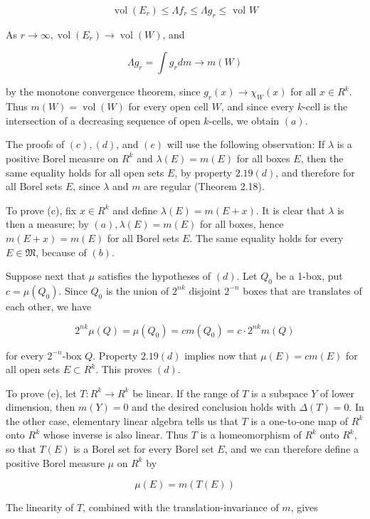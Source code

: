 \documentclass[10pt]{article}
\begin{document}
$$
\operatorname{vol}\left(E_{r}\right) \leq \Lambda f_{r} \leq \Lambda g_{r} \leq \text { vol } W
$$

As $r \rightarrow \infty, \operatorname{vol}\left(E_{r}\right) \rightarrow \operatorname{vol}(W)$, and

$$
\Lambda g_{r}=\int g_{r} d m \rightarrow m(W)
$$

by the monotone convergence theorem, since $g_{r}(x) \rightarrow \chi_{W}(x)$ for all $x \in R^{k}$. Thus $m(W)=\operatorname{vol}(W)$ for every open cell $W$, and since every $k$-cell is the intersection of a decreasing sequence of open $k$-cells, we obtain $(a)$.

The proofs of $(c),(d)$, and $(e)$ will use the following observation: If $\lambda$ is a positive Borel measure on $R^{k}$ and $\lambda(E)=m(E)$ for all boxes $E$, then the same equality holds for all open sets $E$, by property $2.19(d)$, and therefore for all Borel sets $E$, since $\lambda$ and $m$ are regular (Theorem 2.18).

To prove (c), fix $x \in R^{k}$ and define $\lambda(E)=m(E+x)$. It is clear that $\lambda$ is then a measure; by $(a), \lambda(E)=m(E)$ for all boxes, hence $m(E+x)=m(E)$ for all Borel sets $E$. The same equality holds for every $E \in \mathfrak{M}$, because of $(b)$.

Suppose next that $\mu$ satisfies the hypotheses of $(d)$. Let $Q_{0}$ be a 1-box, put $c=\mu\left(Q_{0}\right)$. Since $Q_{0}$ is the union of $2^{n k}$ disjoint $2^{-n}$ boxes that are translates of each other, we have

$$
2^{n k} \mu(Q)=\mu\left(Q_{0}\right)=c m\left(Q_{0}\right)=c \cdot 2^{n k} m(Q)
$$

for every $2^{-n}$-box $Q$. Property $2.19(d)$ implies now that $\mu(E)=c m(E)$ for all open sets $E \subset R^{k}$. This proves $(d)$.

To prove (e), let $T: R^{k} \rightarrow R^{k}$ be linear. If the range of $T$ is a subspace $Y$ of lower dimension, then $m(Y)=0$ and the desired conclusion holds with $\Delta(T)=0$. In the other case, elementary linear algebra tells us that $T$ is a one-to-one map of $R^{k}$ onto $R^{k}$ whose inverse is also linear. Thus $T$ is a homeomorphism of $R^{k}$ onto $R^{k}$, so that $T(E)$ is a Borel set for every Borel set $E$, and we can therefore define a positive Borel measure $\mu$ on $R^{k}$ by

$$
\mu(E)=m(T(E))
$$

The linearity of $T$, combined with the translation-invariance of $m$, gives
\end{document}
